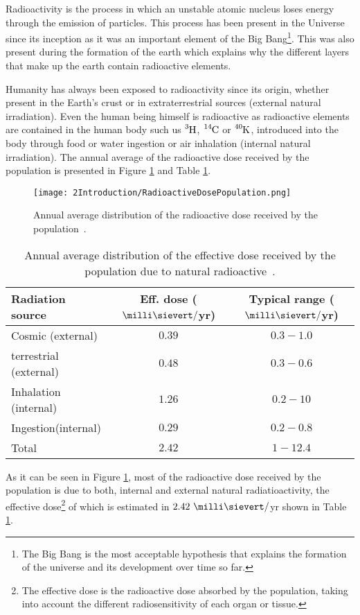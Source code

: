 Radioactivity is the process in which an unstable atomic nucleus loses energy through the emission of particles. This process has been present in the Universe since its inception as it was an important element of the Big Bang\footnote{The Big Bang is the most acceptable hypothesis that explains the formation of the universe and its development over time so far.}. This was also present during the formation of the earth which explains why the different layers that make up the earth contain radioactive elements. 

Humanity has always been exposed to radioactivity since its origin, whether present in the Earth's crust or in extraterrestrial sources (external natural irradiation). Even the human being himself is radioactive as radioactive elements are contained in the human body such us $\ce{^{3}H}$, $\ce{^{14}C}$ or $\ce{^{40}K}$, introduced into the body through food or water ingestion or air inhalation (internal natural irradiation). The annual average of the radioactive dose received by the population is presented in Figure \ref{fig:RadioactiveDosePopulation} and Table \ref{tab:RadioactiveNaturalDosePopulation}.

\begin{figure}[h]
\texttt{[image: 2Introduction/RadioactiveDosePopulation.png]}
\centering
\caption{Annual average distribution of the radioactive dose received by the population~\cite{IAEA}\label{fig:RadioactiveDosePopulation}.}
\end{figure}

\begin{table}[htbp]
\centering{}%
\begin{tabular}{lcc}
\toprule 
Radiation source & Eff. dose ($\milli\sievert/$yr) & Typical range ($\milli\sievert/$yr)\tabularnewline
\midrule
\midrule 
Cosmic (external) & $0.39$ & $0.3 - 1.0$ \tabularnewline
terrestrial (external) & $0.48$ & $0.3-0.6$ \tabularnewline  
Inhalation (internal) & $1.26$ & $0.2-10$ \tabularnewline
Ingestion(internal) & $0.29$ & $0.2-0.8$ \tabularnewline
\midrule
Total & $2.42$ & $1-12.4$ \tabularnewline
\bottomrule
\end{tabular}
\caption{Annual average distribution of the effective dose received by the population due to natural radioactive~\cite{UNSCEAR, CSN}.}
\label{tab:RadioactiveNaturalDosePopulation}
\end{table}

As it can be seen in Figure \ref{fig:RadioactiveDosePopulation}, most of the radioactive dose received by the population is due to both, internal and external natural radiatioactivity, the effective dose\footnote{The effective dose is the radioactive dose absorbed by the population, taking into account the different radiosensitivity of each organ or tissue.} of which is estimated in $2.42~\milli\sievert/$yr shown in Table \ref{tab:RadioactiveNaturalDosePopulation}. 


